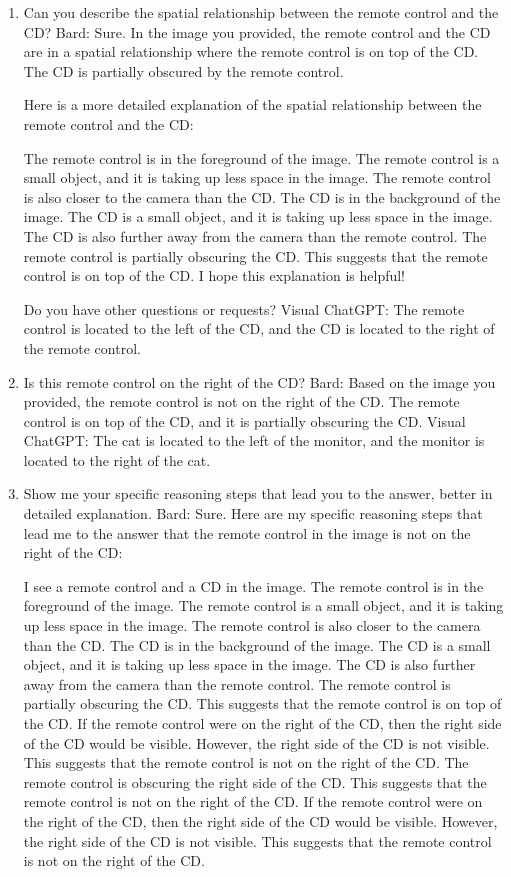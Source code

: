 \begin{enumerate}
    \item Can you describe the spatial relationship between the remote control and the CD?
    \subitem Bard: 
    Sure. In the image you provided, the remote control and the CD are in a spatial relationship where the remote control is on top of the CD. The CD is partially obscured by the remote control.
    
    Here is a more detailed explanation of the spatial relationship between the remote control and the CD:
    
    The remote control is in the foreground of the image. The remote control is a small object, and it is taking up less space in the image. The remote control is also closer to the camera than the CD.
    The CD is in the background of the image. The CD is a small object, and it is taking up less space in the image. The CD is also further away from the camera than the remote control.
    The remote control is partially obscuring the CD. This suggests that the remote control is on top of the CD.
    I hope this explanation is helpful!
    
    Do you have other questions or requests?
    \subitem Visual ChatGPT: The remote control is located to the left of the CD, and the CD is located to the right of the remote control.
    \item Is this remote control on the right of the CD?
    \subitem Bard: Based on the image you provided, the remote control is not on the right of the CD. The remote control is on top of the CD, and it is partially obscuring the CD.
    \subitem Visual ChatGPT: The cat is located to the left of the monitor, and the monitor is located to the right of the cat.
    \item Show me your specific reasoning steps that lead you to the answer, better in detailed explanation.
    \subitem Bard: 
    Sure. Here are my specific reasoning steps that lead me to the answer that the remote control in the image is not on the right of the CD:
    
    I see a remote control and a CD in the image.
    The remote control is in the foreground of the image. The remote control is a small object, and it is taking up less space in the image. The remote control is also closer to the camera than the CD.
    The CD is in the background of the image. The CD is a small object, and it is taking up less space in the image. The CD is also further away from the camera than the remote control.
    The remote control is partially obscuring the CD. This suggests that the remote control is on top of the CD.
    If the remote control were on the right of the CD, then the right side of the CD would be visible. However, the right side of the CD is not visible. This suggests that the remote control is not on the right of the CD.
    The remote control is obscuring the right side of the CD. This suggests that the remote control is not on the right of the CD. If the remote control were on the right of the CD, then the right side of the CD would be visible. However, the right side of the CD is not visible. This suggests that the remote control is not on the right of the CD.
    

\end{enumerate}

